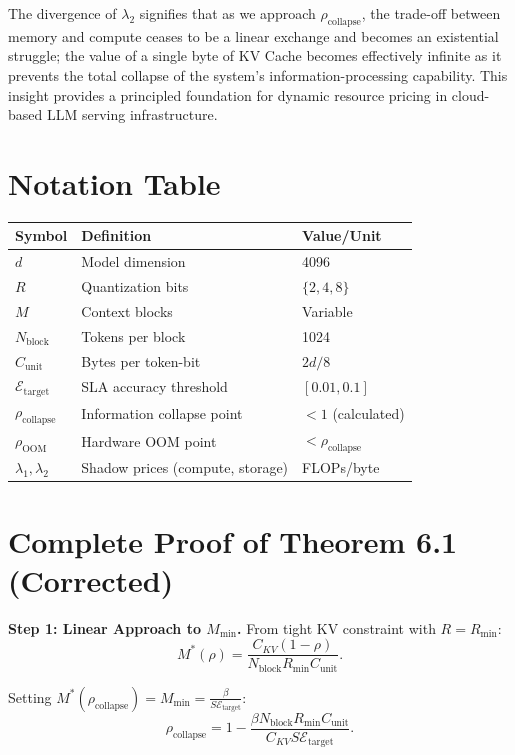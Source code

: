 \documentclass[11pt,a4paper]{article}
\theoremstyle{plain}
\theoremstyle{definition}
\theoremstyle{remark}
\begin{document}
The divergence of $\lambda_2$ signifies that as we approach $\rho_{\text{collapse}}$, the trade-off between memory and compute ceases to be a linear exchange and becomes an existential struggle; the value of a single byte of KV Cache becomes effectively infinite as it prevents the total collapse of the system's information-processing capability. This insight provides a principled foundation for dynamic resource pricing in cloud-based LLM serving infrastructure.

\newpage
\appendix

\section{Notation Table}\label{app:notation}

\begin{table}[h]
\centering
\begin{tabular}{@{}lll@{}}
\toprule
Symbol & Definition & Value/Unit \\
\midrule
$d$ & Model dimension & 4096 \\
$R$ & Quantization bits & $\{2,4,8\}$ \\
$M$ & Context blocks & Variable \\
$N_{\text{block}}$ & Tokens per block & 1024 \\
$C_{\text{unit}}$ & Bytes per token-bit & $2d/8$ \\
$\mathcal{E}_{\text{target}}$ & SLA accuracy threshold & $[0.01, 0.1]$ \\
$\rho_{\text{collapse}}$ & Information collapse point & $<1$ (calculated) \\
$\rho_{\text{OOM}}$ & Hardware OOM point & $<\rho_{\text{collapse}}$ \\
$\lambda_1, \lambda_2$ & Shadow prices (compute, storage) & FLOPs/byte \\
\bottomrule
\end{tabular}
\end{table}

\section{Complete Proof of Theorem 6.1 (Corrected)}\label{app:proof_corrected}

\textbf{Step 1: Linear Approach to $M_{\min}$.} From tight KV constraint with $R = R_{\min}$:
$$ M^*(\rho) = \frac{C_{KV}(1-\rho)}{N_{\text{block}} R_{\min} C_{\text{unit}}}. $$

Setting $M^*(\rho_{\text{collapse}}) = M_{\min} = \frac{\beta}{S \mathcal{E}_{\text{target}}}$:
$$ \rho_{\text{collapse}} = 1 - \frac{\beta N_{\text{block}} R_{\min} C_{\text{unit}}}{C_{KV} S \mathcal{E}_{\text{target}}}. $$
\end{document}
